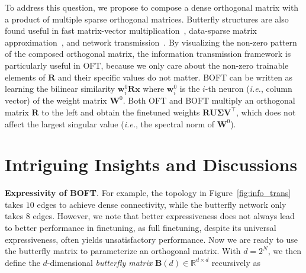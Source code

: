 To address this question, we propose to compose a dense orthogonal matrix with a product of multiple sparse orthogonal matrices. Butterfly structures are also found useful in fast matrix-vector multiplication~\cite{michielssen1996multilevel,o2010algorithm}, data-sparse matrix approximation~\cite{li2015butterfly}, and network transmission~\cite{klasing1994broadcasting,li2003linear,rajasingh2016transmission}. By visualizing the non-zero pattern of the composed orthogonal matrix, the information transmission framework is particularly useful in OFT, because we only care about the non-zero trainable elements of $\bm{R}$ and their specific values do not matter. BOFT can be written as learning the bilinear similarity $\bm{w}^0_i\bm{R}\bm{x}$ where $\bm{w}^0_i$ is the $i$-th neuron (\emph{i.e.}, column vector) of the weight matrix $\bm{W}^0$. Both OFT and BOFT multiply an orthogonal matrix $\bm{R}$ to the left and obtain the finetuned weights $\bm{R}\bm{U}\bm{\Sigma}\bm{V}^\top$, which does not affect the largest singular value (\emph{i.e.}, the spectral norm of $\bm{W}^0$). \section{Intriguing Insights and Discussions}

\textbf{Expressivity of BOFT}. For example, the topology in Figure~\ref{fig:info_trans} takes $10$ edges to achieve dense connectivity, while the butterfly network only takes $8$ edges. However, we note that better expressiveness does not always lead to better performance in finetuning, as full finetuning, despite its universal expressiveness, often yields unsatisfactory performance. Now we are ready to use the butterfly matrix to parameterize an orthogonal matrix. With $d=2^N$, we then define the $d$-dimensional \emph{butterfly matrix} $\bm{B}(d)\in\mathbb{R}^{d\times d}$ recursively as

